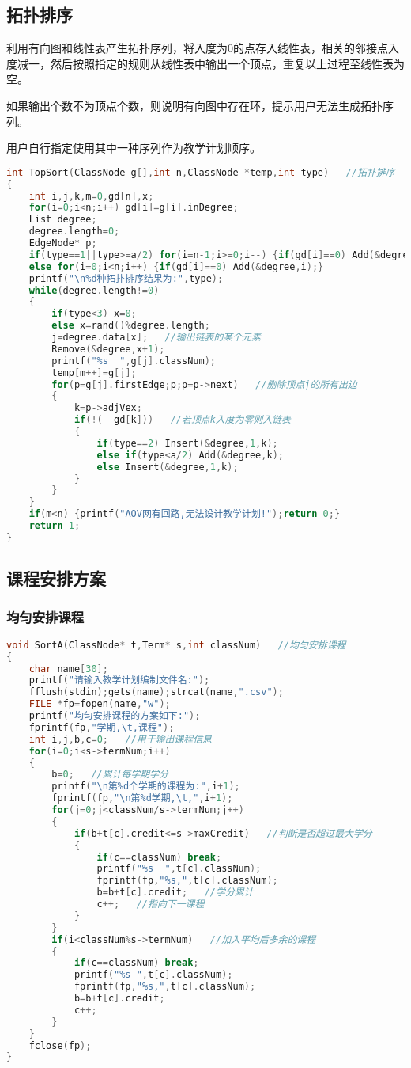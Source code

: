 \documentclass{DateStructure}
\begin{document}
\subsection{拓扑排序}
利用有向图和线性表产生拓扑序列，将入度为0的点存入线性表，相关的邻接点入度减一，然后按照指定的规则从线性表中输出一个顶点，重复以上过程至线性表为空。\par
如果输出个数不为顶点个数，则说明有向图中存在环，提示用户无法生成拓扑序列。\par
用户自行指定使用其中一种序列作为教学计划顺序。
\begin{lstlisting}[language=c,caption={TopSort}]
int TopSort(ClassNode g[],int n,ClassNode *temp,int type)   //拓扑排序
{
	int i,j,k,m=0,gd[n],x;
	for(i=0;i<n;i++) gd[i]=g[i].inDegree;
	List degree;
    degree.length=0;
	EdgeNode* p;
	if(type==1||type>=a/2) for(i=n-1;i>=0;i--) {if(gd[i]==0) Add(&degree,i);}
	else for(i=0;i<n;i++) {if(gd[i]==0) Add(&degree,i);}
	printf("\n%d种拓扑排序结果为:",type);
	while(degree.length!=0)
	{
		if(type<3) x=0;
		else x=rand()%degree.length;
		j=degree.data[x];   //输出链表的某个元素
		Remove(&degree,x+1);
		printf("%s  ",g[j].classNum);
		temp[m++]=g[j];
		for(p=g[j].firstEdge;p;p=p->next)   //删除顶点j的所有出边
		{
			k=p->adjVex;
			if(!(--gd[k]))   //若顶点k入度为零则入链表
			{
				if(type==2) Insert(&degree,1,k);
				else if(type<a/2) Add(&degree,k); 
				else Insert(&degree,1,k);
			}
		}
	}
	if(m<n) {printf("AOV网有回路,无法设计教学计划!");return 0;}
	return 1;
}
\end{lstlisting}
\subsection{课程安排方案}
\subsubsection{均匀安排课程}
\begin{lstlisting}[language=c,caption={SortA}]
void SortA(ClassNode* t,Term* s,int classNum)   //均匀安排课程
{
    char name[30];
	printf("请输入教学计划编制文件名:");
	fflush(stdin);gets(name);strcat(name,".csv");
	FILE *fp=fopen(name,"w");
	printf("均匀安排课程的方案如下:");
	fprintf(fp,"学期,\t,课程");
	int i,j,b,c=0;   //用于输出课程信息
	for(i=0;i<s->termNum;i++)
	{
		b=0;   //累计每学期学分
		printf("\n第%d个学期的课程为:",i+1);
		fprintf(fp,"\n第%d学期,\t,",i+1);
		for(j=0;j<classNum/s->termNum;j++)
		{
			if(b+t[c].credit<=s->maxCredit)   //判断是否超过最大学分
			{
				if(c==classNum) break;
				printf("%s  ",t[c].classNum);
				fprintf(fp,"%s,",t[c].classNum);
				b=b+t[c].credit;   //学分累计
				c++;   //指向下一课程
			}
		}
		if(i<classNum%s->termNum)   //加入平均后多余的课程
		{
			if(c==classNum) break;
			printf("%s ",t[c].classNum);
			fprintf(fp,"%s,",t[c].classNum);
			b=b+t[c].credit;
			c++;
		}
	}
	fclose(fp);
}
\end{lstlisting}
\end{document}
